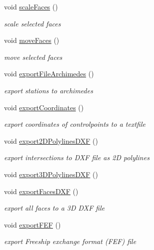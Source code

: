 \begin{DoxyCompactItemize}
void \hyperlink{classShipCAD_1_1Controller_a5f14267f3c2906bfaf755536efaeea18}{scale\+Faces} ()
\begin{DoxyCompactList}\small\item\em scale selected faces \end{DoxyCompactList}\item 
void \hyperlink{classShipCAD_1_1Controller_ac7aabbfcf700269dc82610c73a129c03}{move\+Faces} ()
\begin{DoxyCompactList}\small\item\em move selected faces \end{DoxyCompactList}\item 
void \hyperlink{classShipCAD_1_1Controller_a3c229cc7b4660933229250ba77e197f7}{export\+File\+Archimedes} ()
\begin{DoxyCompactList}\small\item\em export stations to archimedes \end{DoxyCompactList}\item 
void \hyperlink{classShipCAD_1_1Controller_a3a36570218825d074f256ee3650c5a8b}{export\+Coordinates} ()
\begin{DoxyCompactList}\small\item\em export coordinates of controlpoints to a textfile \end{DoxyCompactList}\item 
void \hyperlink{classShipCAD_1_1Controller_a7941ff51b66de58b883d2b0f46003af9}{export2\+D\+Polylines\+D\+XF} ()
\begin{DoxyCompactList}\small\item\em export intersections to D\+XF file as 2D polylines \end{DoxyCompactList}\item 
void \hyperlink{classShipCAD_1_1Controller_a2a54e6215052d6a06d1119a84d2f7d85}{export3\+D\+Polylines\+D\+XF} ()
\item 
void \hyperlink{classShipCAD_1_1Controller_aa663e1b23df9ee100def2c4ddd7cd125}{export\+Faces\+D\+XF} ()
\begin{DoxyCompactList}\small\item\em export all faces to a 3D D\+XF file \end{DoxyCompactList}\item 
void \hyperlink{classShipCAD_1_1Controller_a6041d09e04e4360dd21c9cce963ee6e2}{export\+F\+EF} ()
\begin{DoxyCompactList}\small\item\em export Freeship exchange format (F\+EF) file \end{DoxyCompactList}\item 

\end{DoxyCompactItemize}
